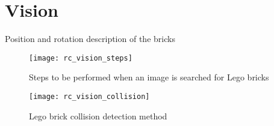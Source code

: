 \section{Vision}
\label{sec:rc_hmi_sec}
Position and rotation description of the bricks \\


	\begin{figure}[H]
		\centering
	    \texttt{[image: rc\_vision\_steps]}
	    \caption{Steps to be performed when an image is searched for Lego bricks}
		\label{fig:rc_vision_steps}
	\end{figure}
	
	\begin{figure}[H]
		\centering
	    \texttt{[image: rc\_vision\_collision]}
	    \caption{Lego brick collision detection method}
		\label{fig:rc_vision_collision}
	\end{figure}